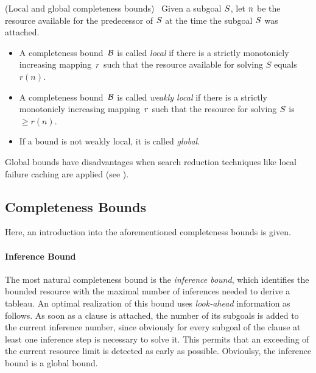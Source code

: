 \newcommand{\dt}{{\cal T}}                    %
\newcommand{\rf}{{\cal R}}                    %
\newcommand{\cb}{{\cal B}}                    %
\newcommand{\cbt}[1]{{\cal B}({\cal T},#1)}
\newcommand{\cbtn}{{\cal B}({\cal T},n)}

\begin{definition} {\sf (\/Local and global completeness bounds\/)}\
\label{definition-local_bound}%
Given a subgoal $S\/$, let $n\/$ be the resource available for the
predecessor of $S\/$ at the time the subgoal $S\/$ was attached.
\begin{itemize}
\item A completeness bound~$\cb\/$ is called {\em local} 
      if there is a strictly monotonicly increasing mapping~$r\/$ 
      such that the resource available for solving $S$ equals $r(n)$.
\item A completeness bound~$\cb\/$ is called {\em weakly local\/} 
      if there is a strictly monotonicly increasing mapping~$r\/$ 
      such that the resource for solving $S\/$ is $\geq r(n)$. 
\item If a bound is not weakly local, it is called {\em global}.
\end{itemize}
\end{definition}

Global bounds have disadvantages when search reduction techniques like
local failure caching are applied (see \cite{LI96}). 


\subsection{Completeness Bounds}

Here, an introduction into the aforementioned completeness bounds is
given.  

\paragraph{Inference Bound}
The most natural completeness bound is the {\em inference bound}, which 
identifies the bounded resource with the maximal number of inferences
needed to derive a tableau.
An optimal realization of this bound uses {\em look-ahead\/} information 
as follows.
As soon as a clause is attached, the number of its subgoals is added to 
the current inference number, since obviously for every subgoal of the 
clause at least one inference step is necessary to solve it.
This permits that an exceeding of the current resource limit is detected
as early as possible.
Obvioulsy, the inference bound is a global bound. 

